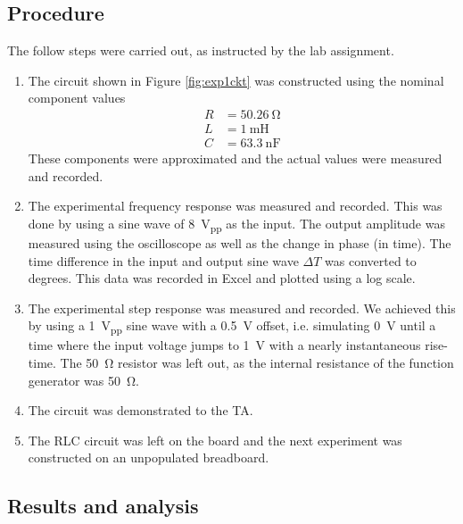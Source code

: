 \documentclass{report}
\newcommand{\pp}{_{pp}}
\newcommand{\Vpp}{\V\pp}
\begin{document}
\subsection{Procedure}
The follow steps were carried out, as instructed by the lab assignment.
\begin{enumerate}
	\item The circuit shown in Figure \ref{fig:exp1ckt} was constructed using the nominal component values \begin{align*}
		R & = \SI{50.26}{\ohm} \\
		L & = \SI{1}{\milli\henry} \\
		C & = \SI{63.3}{\nano\farad}
	\end{align*}
	These components were approximated and the actual values were measured and recorded.
	
	\item The experimental frequency response was measured and recorded. This was done by using a sine wave of \SI{8}{\Vpp} as the input. The output amplitude was measured using the oscilloscope as well as the change in phase (in time). The time difference in the input and output sine wave $\Delta T$ was converted to degrees. This data was recorded in Excel and plotted using a log scale. 
	
	\item The experimental step response was measured and recorded. We achieved this by using a \SI{1}{\Vpp} sine wave with a \SI{0.5}{\V} offset, i.e. simulating \SI{0}{\V} until a time where the input voltage jumps to \SI{1}{\V} with a nearly instantaneous rise-time. The \SI{50}{\ohm} resistor was left out, as the internal resistance of the function generator was \SI{50}{\ohm}.
	
	\item The circuit was demonstrated to the TA.
	\item The RLC circuit was left on the board and the next experiment was constructed on an unpopulated breadboard.
\end{enumerate}

\subsection{Results and analysis}
\end{document}
